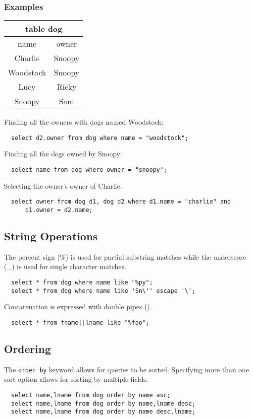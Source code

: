 \documentclass{math}
\begin{document}
\subsubsection*{Examples}
\begin{center}
  \begin{tabular}{|c|c|}
    \hline
    \multicolumn{2}{|c|}{table dog} \\
    \hline
    name & owner \\
    \hline
    Charlie & Snoopy \\
    Woodstock & Snoopy \\
    Lucy & Ricky \\
    Snoopy & Sam \\
    \hline
  \end{tabular}
\end{center}
Finding all the owners with dogs named Woodstock:
\begin{lstlisting}
  select d2.owner from dog where name = "woodstock";
\end{lstlisting}
Finding all the dogs owned by Snoopy:
\begin{lstlisting}
  select name from dog where owner = "snoopy";
\end{lstlisting}
Selecting the owner's owner of Charlie:
\begin{lstlisting}
  select owner from dog d1, dog d2 where d1.name = "charlie" and
      d1.owner = d2.name;
\end{lstlisting}

\subsection*{String Operations}
The percent sign (\%) is used for partial substring matches while the
underscore (\_) is used for single character matches.
\begin{lstlisting}
  select * from dog where name like "%py";
  select * from dog where name like 'Sn\'' escape '\';
\end{lstlisting}
Concatenation is expressed with double pipes (\textbar\textbar).
\begin{lstlisting}
  select * from fname||lname like "%foo";
\end{lstlisting}

\subsection*{Ordering}
The \texttt{order by} keyword allows for queries to be sorted. Specifying more
than one sort option allows for sorting by multiple fields.
\begin{lstlisting}
  select name,lname from dog order by name asc;
  select name,lname from dog order by name,lname desc;
  select name,lname from dog order by name desc,lname;
\end{lstlisting}
\end{document}
